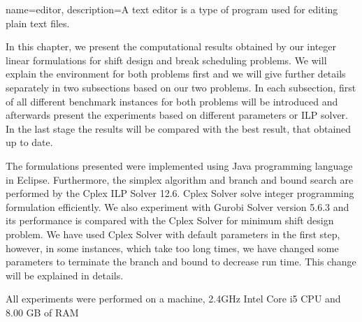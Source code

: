 %
%
%
%



{
  name={editor},
  description={A text editor is a type of program used for editing plain text files.}
}


In this chapter, we present the computational results obtained by our integer linear formulations for shift design and break scheduling problems. We will explain the environment for both problems first and we will give further details separately in two subsections based on our two problems. In each subsection, first of all different benchmark instances for both problems will be introduced and afterwards present the experiments based on different parameters or ILP solver. In the last stage the results will be compared with the best result, that obtained up to date.

The formulations presented were implemented using Java programming language in Eclipse. Furthermore, the simplex algorithm and branch and bound search are performed by the Cplex ILP Solver 12.6. Cplex Solver solve integer programming
formulation efficiently. We also experiment with Gurobi Solver version 5.6.3 and its performance is compared with the Cplex Solver for minimum shift design problem. We have used Cplex Solver with default parameters in the first step, however, in some instances, which take too long times, we have changed some parameters to terminate the branch and bound to decrease run time. This change will be explained in details.

All experiments were performed on a machine, 2.4GHz Intel Core i5 CPU and 8.00 GB of RAM

